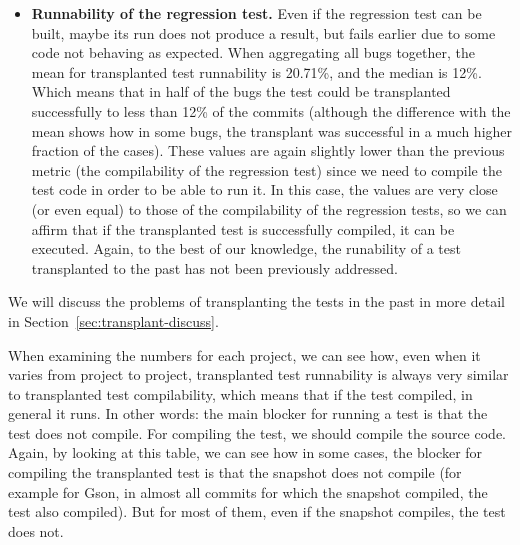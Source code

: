 \begin{itemize}
\item \textbf{Runnability of the regression test.} Even if the regression test can be built, maybe its run does not produce a result, but fails earlier due to some code not behaving as expected. 
When aggregating all bugs together, the mean for transplanted test runnability is 20.71\%, and the median is 12\%. 
Which means that in half of the bugs the test could be transplanted successfully to less than 12\% of the commits (although the difference with the mean shows how in some bugs, the transplant was successful in a much higher fraction of the cases). 
These values are again slightly lower than the previous metric (the compilability of the regression test) since we need to compile the test code in order to be able to run it. In this case, the values are very close (or even equal) to those of the compilability of the regression tests, so we can affirm that if the transplanted test is successfully compiled, it can be executed.
Again, to the best of our knowledge, the runability of a test transplanted to the past has not been previously addressed.
\end{itemize}

We will discuss the problems of transplanting the tests in the past in more detail in Section~\ref{sec:transplant-discuss}.

When examining the numbers for each project, we can see how, even when it varies from project to project, transplanted test runnability is always very similar to transplanted test compilability, which means that if the test compiled, in general it runs. In other words: the main blocker for running a test is that the test does not compile. For compiling the test, we should compile the source code. Again, by looking at this table, we can see how in some cases, the blocker for compiling the transplanted test is that the snapshot does not compile (for example for Gson, in almost all commits for which the snapshot compiled, the test also compiled). But for most of them, even if the snapshot compiles, the test does not.

